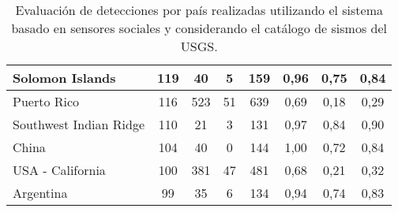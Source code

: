 {\begin{table}[!ht]
\begin{tabular}{|l|ccc|c|ccc|}
Solomon Islands	 & 119 	 & 40 	 & 5 	& 159	 & 0,96 &	0,75 &	0,84 \\ \hline
Puerto Rico	 & 116 	 & 523 	 & 51 	& 639	 & 0,69 &	0,18 &	0,29 \\ \hline
Southwest Indian Ridge	 & 110 	 & 21 	 & 3 	& 131	 & 0,97 &	0,84 &	0,90 \\ \hline
China	 & 104 	 & 40 	 & 0   	& 144	 & 1,00 &	0,72 &	0,84 \\ \hline
USA - California	 & 100 	 & 381 	 & 47 	& 481	 & 0,68 &	0,21 &	0,32 \\ \hline
Argentina	 & 99 	 & 35 	 & 6 	& 134	 & 0,94 &	0,74 &	0,83 \\ \hline
   \end{tabular}
  \caption{Evaluación de detecciones por país realizadas utilizando el sistema basado en sensores sociales y considerando el catálogo de sismos del USGS.}
  \label{table:all-detections-01}
\end{table}}

